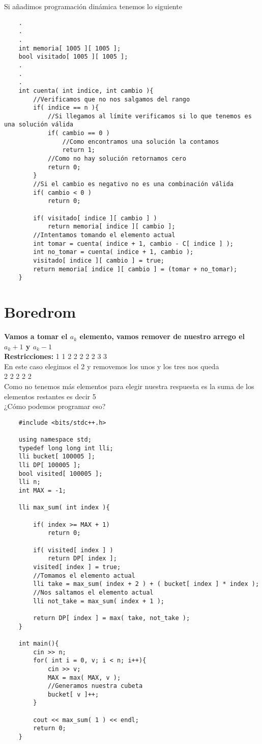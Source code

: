 Si añadimos programación dinámica tenemos lo siguiente

\begin{lstlisting}
    .
    .
    .
    int memoria[ 1005 ][ 1005 ];
    bool visitado[ 1005 ][ 1005 ];
    .
    .
    .
    int cuenta( int indice, int cambio ){
        //Verificamos que no nos salgamos del rango
        if( indice == n ){
            //Si llegamos al límite verificamos si lo que tenemos es una solución válida
            if( cambio == 0 )
                //Como encontramos una solución la contamos
                return 1;
            //Como no hay solución retornamos cero
            return 0;
        }
        //Si el cambio es negativo no es una combinación válida
        if( cambio < 0 )
            return 0;
    
        if( visitado[ indice ][ cambio ] )
            return memoria[ indice ][ cambio ];
        //Intentamos tomando el elemento actual
        int tomar = cuenta( indice + 1, cambio - C[ indice ] );
        int no_tomar = cuenta( indice + 1, cambio );
        visitado[ indice ][ cambio ] = true;
        return memoria[ indice ][ cambio ] = (tomar + no_tomar);
    }
\end{lstlisting}


\section{Boredrom}
\textbf{Vamos a tomar el $a_{k}$ elemento, vamos remover de nuestro arrego el $a_{k} + 1$ y $a_{k} - 1$ }\\
\textbf{Restricciones: }
1 1 2 2 2 2 2 3 3 \\
En este caso elegimos el 2 y removemos los unos y los tres nos queda \\
2 2 2 2 2 \\ 
Como no tenemos más elementos para elegir nuestra respuesta es la suma de los elementos restantes es decir 5 \\
¿Cómo podemos programar eso?
\begin{lstlisting}
    #include <bits/stdc++.h>

    using namespace std;
    typedef long long int lli;
    lli bucket[ 100005 ];
    lli DP[ 100005 ];
    bool visited[ 100005 ];
    lli n;
    int MAX = -1;
    
    lli max_sum( int index ){
    
        if( index >= MAX + 1)
            return 0;
        
        if( visited[ index ] )
            return DP[ index ];
        visited[ index ] = true;
        //Tomamos el elemento actual
        lli take = max_sum( index + 2 ) + ( bucket[ index ] * index );
        //Nos saltamos el elemento actual
        lli not_take = max_sum( index + 1 );
    
        return DP[ index ] = max( take, not_take );
    }
    
    int main(){
        cin >> n;
        for( int i = 0, v; i < n; i++){
            cin >> v;
            MAX = max( MAX, v );
            //Generamos nuestra cubeta
            bucket[ v ]++;
        }
        
        cout << max_sum( 1 ) << endl;
        return 0;
    }
\end{lstlisting}